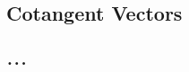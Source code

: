 \documentclass[a4paper,11pt]{article}
\theoremstyle{remark}
\begin{document}
\subsection{Cotangent Vectors}


\section{$\ldots$}





\end{document}
